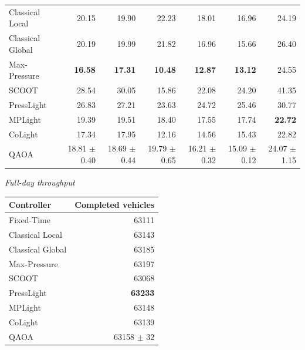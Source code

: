 \begin{table}[htbp]
{\begin{tabular}{lrrrrrr}
Classical Local & 20.15 & 19.90 & 22.23 & 18.01 & 16.96 & 24.19 \\
Classical Global & 20.19 & 19.99 & 21.82 & 16.96 & 15.66 & 26.40 \\
Max-Pressure & \textbf{16.58} & \textbf{17.31} & \textbf{10.48} & \textbf{12.87} & \textbf{13.12} & 24.55 \\
SCOOT & 28.54 & 30.05 & 15.86 & 22.08 & 24.20 & 41.35 \\
PressLight & 26.83 & 27.21 & 23.63 & 24.72 & 25.46 & 30.77 \\
MPLight & 19.39 & 19.51 & 18.40 & 17.55 & 17.74 & \textbf{22.72} \\
CoLight & 17.34 & 17.95 & 12.16 & 14.56 & 15.43 & 22.82 \\
QAOA & 18.81 $\pm$ 0.40 & 18.69 $\pm$ 0.44 & 19.79 $\pm$ 0.65 & 16.21 $\pm$ 0.32 & 15.09 $\pm$ 0.12 & 24.07 $\pm$ 1.15 \\
\bottomrule
\end{tabular}%
}
\vspace{5pt}
\textit{Full-day throughput}\\[2pt]
\begin{tabular}{lr}
\toprule
Controller & Completed vehicles \\
\midrule
Fixed-Time & 63111 \\
Classical Local & 63143 \\
Classical Global & 63185 \\
Max-Pressure & 63197 \\
SCOOT & 63068 \\
PressLight & \textbf{63233} \\
MPLight & 63148 \\
CoLight & 63139 \\
QAOA & 63158 $\pm$ 32 \\
\bottomrule
\end{tabular}
\end{table}

